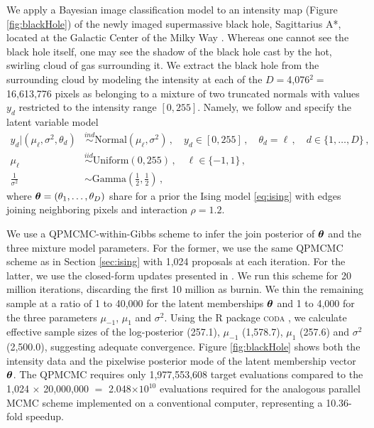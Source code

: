 \documentclass[12pt]{article} %
\begin{document}
We apply a Bayesian image classification model to an intensity map (Figure \ref{fig:blackHole}) of the newly imaged supermassive black hole, Sagittarius A*, located at the Galactic Center of the Milky Way \citep{akiyama2022first}.  Whereas one cannot see the black hole itself, one may see the shadow of the black hole cast by the hot, swirling cloud of gas surrounding it.  We extract the black hole from the surrounding cloud by modeling the intensity at each of the $D=$4,076$^2=$16,613,776 pixels as belonging to a mixture of two truncated normals with values $y_{d}$ restricted to the intensity range $[0,255]$.  Namely, we follow \citet{hurn1997difficulties} and specify the latent variable model
\begin{align*}
	y_d |(\mu_\ell, \sigma^2, \theta_d) &\stackrel{ind}{\sim} \mbox{Normal}(\mu_\ell,\sigma^2 ) \, ,\quad y_d \in [0,255] \, , \quad \theta_d=\ell \,,\quad d\in \{1,\dots,D\}\, ,\\
	\mu_\ell &\stackrel{iid}{\sim} \mbox{Uniform} (0,255) \,  , \quad \ell \in \{-1,1\} \, , \\
	\frac{1}{\sigma^2} &\sim  \mbox{Gamma}\left(\frac{1}{2}, \frac{1}{2} \right)  \, ,
\end{align*}
where $\boldsymbol{\theta}=(\theta_1,\dots,\theta_D)$ share for a prior the Ising model \eqref{eq:ising} with edges joining neighboring pixels and interaction $\rho=1.2$. 

We use a QPMCMC-within-Gibbs scheme to infer the join posterior of $\boldsymbol{\theta}$ and the three mixture model parameters.  For the former, we use the same QPMCMC scheme as in Section \ref{sec:ising} with 1,024 proposals at each iteration. For the latter, we use the closed-form updates presented in \citet{hurn1997difficulties}.  We run this scheme for 20 million iterations, discarding the first 10 million as burnin.  We thin the remaining sample at a ratio of 1 to 40,000 for the latent memberships $\boldsymbol{\theta}$ and 1 to 4,000 for the three parameters $\mu_{-1}$, $\mu_1$ and $\sigma^2$.  Using the \textsc{R} package \textsc{coda} \citep{coda}, we calculate effective sample sizes of the log-posterior (257.1), $\mu_{-1}$ (1,578.7), $\mu_1$ (257.6) and $\sigma^2$ (2,500.0), suggesting adequate convergence.   Figure \ref{fig:blackHole} shows both the intensity data and the pixelwise posterior mode of the latent membership vector $\boldsymbol{\theta}$.  The QPMCMC requires only 1,977,553,608 target evaluations compared to the 1,024 $\times$ 20,000,000 $=$ 2.048$\times10^{10}$ evaluations required for the analogous parallel MCMC scheme implemented on a conventional computer, representing a 10.36-fold speedup.
\end{document}
